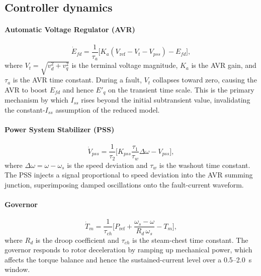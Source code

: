 \documentclass[journal,twoside,letterpaper]{IEEEtran}
\begin{document}
\subsection{Controller dynamics}

\paragraph{Automatic Voltage Regulator (AVR)}
\begin{equation}
  \dot{E}_{fd} = \frac{1}{\tau_a}\bigl[K_a(V_{\mathrm{ref}}
                - V_t - V_{pss}) - E_{fd}\bigr],
\label{eq:avr}
\end{equation}
where $V_t = \sqrt{v_d^2 + v_q^2}$ is the terminal voltage
magnitude, $K_a$ is the AVR gain, and $\tau_a$ is the AVR
time constant.
During a fault, $V_t$ collapses toward zero, causing the AVR
to boost $E_{fd}$ and hence $E'_q$ on the transient time
scale.
This is the primary mechanism by which $I_{ss}$ rises beyond
the initial subtransient value, invalidating the
constant-$I_{ss}$ assumption of the reduced model.

\paragraph{Power System Stabilizer (PSS)}
\begin{equation}
  \dot{V}_{pss} = \frac{1}{\tau_2}\biggl[K_{pss}
                  \frac{\tau_1}{\tau_w}\Delta\omega
                  - V_{pss}\biggr],
\label{eq:pss}
\end{equation}
where $\Delta\omega = \omega - \omega_s$ is the speed
deviation and $\tau_w$ is the washout time constant.
The PSS injects a signal proportional to speed deviation into
the AVR summing junction, superimposing damped oscillations
onto the fault-current waveform.

\paragraph{Governor}
\begin{equation}
  \dot{T}_m = \frac{1}{\tau_{ch}}\biggl[P_{\mathrm{ref}}
              + \frac{\omega_s - \omega}{R_d\,\omega_s}
              - T_m\biggr],
\label{eq:gov}
\end{equation}
where $R_d$ is the droop coefficient and $\tau_{ch}$ is the
steam-chest time constant.
The governor responds to rotor deceleration by ramping up
mechanical power, which affects the torque balance and
hence the sustained-current level over a 0.5--2.0~s window.
\end{document}

